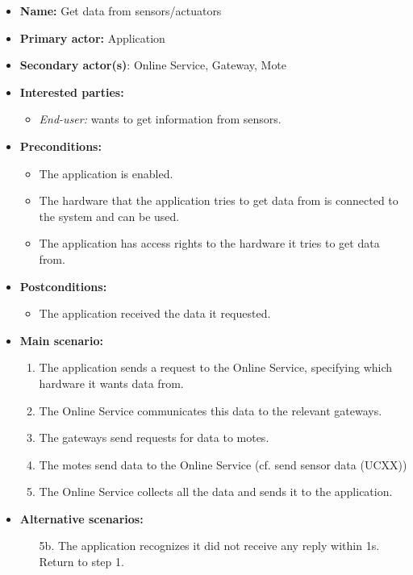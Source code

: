 \begin{itemize}
    \item \textbf{Name:} Get data from sensors/actuators
    \item \textbf{Primary actor:} Application
    \item \textbf{Secondary actor(s)}: Online Service, Gateway, Mote
    \item \textbf{Interested parties:}
        \begin{itemize}
            \item \textit{End-user:} wants to get information from sensors.
        \end{itemize}

    \item \textbf{Preconditions:}
        \begin{itemize}
            \item The application is enabled.
            \item The hardware that the application tries to get data from
                  is connected to the system and can be used.
            \item The application has access rights to the hardware it tries to
                  get data from.
        \end{itemize}

    \item \textbf{Postconditions:}
        \begin{itemize}
            \item The application received the data it requested.
        \end{itemize}

    \item \textbf{Main scenario:}
    \begin{enumerate}
       \item The application sends a request to the Online Service, specifying
             which hardware it wants data from.
       \item The Online Service communicates this data to the relevant gateways.
       \item The gateways send requests for data to motes.
       \item The motes send data to the Online Service (cf. send sensor data (UCXX))
       \item The Online Service collects all the data and sends it to the application.
    \end{enumerate}

    \item \textbf{Alternative scenarios:}
    \begin{enumerate}
        \item [5b.] The application recognizes it did not receive any reply within 1s.
                    Return to step 1.
    \end{enumerate}
\end{itemize}

